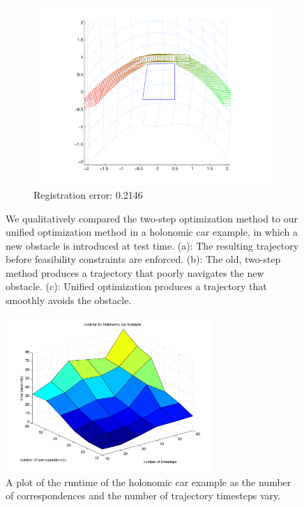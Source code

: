 \begin{figure}
\begin{subfigure}[b]{0.33\textwidth}
\includegraphics[width=\textwidth]{holonomic_unified}
\caption{Registration error: 0.2146}
\label{subfig:holonomic_results_unified}
\end{subfigure}
\caption{We qualitatively compared the two-step optimization method to our unified optimization method in a holonomic car example, in which a new obstacle is introduced at test time. (a): The resulting trajectory before feasibility constraints are enforced. (b): The old, two-step method produces a trajectory that poorly navigates the new obstacle. (c): Unified optimization produces a trajectory that smoothly avoids the obstacle.}
\label{fig:holonomic_results}
\end{figure}

\begin{figure}
\centering
\includegraphics[width=0.7\textwidth]{holonomic_runtime}
\caption{A plot of the runtime of the holonomic car example as the number of correspondences and the number of trajectory timesteps vary.}
\label{fig:holonomic_runtime}
\end{figure}

